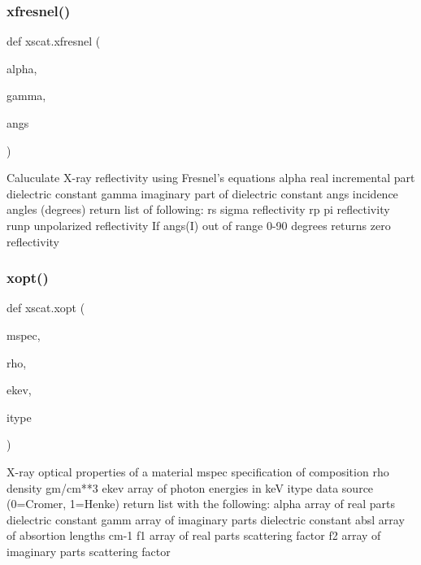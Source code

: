 \mbox{\label{namespacexscat_aec99c26506a5b0eb10d3d43a596e5ec6}} 
\subsubsection{\texorpdfstring{xfresnel()}{xfresnel()}}
{\footnotesize\ttfamily def xscat.\+xfresnel (\begin{DoxyParamCaption}\item[{}]{alpha,  }\item[{}]{gamma,  }\item[{}]{angs }\end{DoxyParamCaption})}

\begin{DoxyVerb}Caluculate X-ray reflectivity using Fresnel's equations
    alpha        real incremental part dielectric constant
    gamma        imaginary part of dielectric constant
    angs         incidence angles (degrees)
return list of following:
    rs           sigma reflectivity
    rp           pi reflectivity
    runp         unpolarized reflectivity
If angs(I) out of range 0-90 degrees returns zero reflectivity
\end{DoxyVerb}
 \mbox{\label{namespacexscat_a86f03d606ff7987c55f5c3b9d8760da5}} 
\subsubsection{\texorpdfstring{xopt()}{xopt()}}
{\footnotesize\ttfamily def xscat.\+xopt (\begin{DoxyParamCaption}\item[{}]{mspec,  }\item[{}]{rho,  }\item[{}]{ekev,  }\item[{}]{itype }\end{DoxyParamCaption})}

\begin{DoxyVerb}X-ray optical properties of a material
    mspec        specification of composition
    rho          density gm/cm**3
    ekev         array of photon energies in keV
    itype        data source (0=Cromer, 1=Henke)
return list with the following:
    alpha        array of real parts dielectric constant
    gamm         array of imaginary parts dielectric constant
    absl         array of absortion lengths cm-1
    f1           array of real parts scattering factor
    f2           array of imaginary parts scattering factor
\end{DoxyVerb}
 